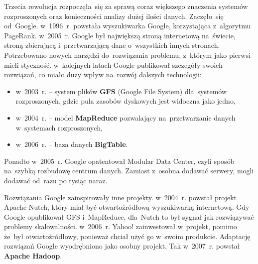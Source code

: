 \documentclass[12pt,a4paper,twoside,titlepage,openright]{book}
\begin{document}
Trzecia rewolucja rozpoczęła~się za sprawą coraz większego znaczenia systemów rozproszonych oraz konieczności analizy dużej ilości danych. Zaczęło~się od~Google. w~1996~r. powstała wyszukiwarka Google, korzystająca z~algorytmu PageRank. w~2005~r. Google był największą stroną internetową na~świecie, stroną zbierającą i~przetwarzającą dane o~wszystkich innych stronach. Potrzebowano nowych narzędzi do~rozwiązania problemu, z~którym jako pierwsi mieli styczność. w~kolejnych latach Google publikował szczegóły swoich rozwiązań, co miało duży wpływ na~rozwój dalszych technologii:
\begin{itemize}
\item w~2003~r. -- system plików \textbf{GFS} (Google File System) dla~systemów rozproszonych, gdzie pula zasobów dyskowych jest widoczna jako jedno,
\item w~2004~r. -- model \textbf{MapReduce} pozwalający na~przetwarzanie danych w~systemach rozproszonych,
\item w~2006~r. -- baza danych \textbf{BigTable}.
\end{itemize}
Ponadto w~2005~r. Google opatentował Modular Data Center, czyli sposób na~szybką rozbudowę centrum danych. Zamiast z~osobna dodawać serwery, mogli dodawać od~razu po tysiąc naraz.

Rozwiązania Google zainspirowały inne projekty. w~2004~r. powstał projekt Apache Nutch, który miał być otwartoźródłową wyszukiwarką internetową. Gdy Google opublikował GFS i~MapReduce, dla~Nutch to był sygnał jak rozwiązywać problemy skalowalności. w~2006~r. Yahoo! zainwestował w~projekt, pomimo że~był otwartoźródłowy, ponieważ chciał użyć go w~swoim produkcie. Adaptację rozwiązań Google wyodrębniono jako osobny projekt. Tak w~2007~r. powstał \textbf{Apache Hadoop}. \cite{hadoop}
\end{document}
